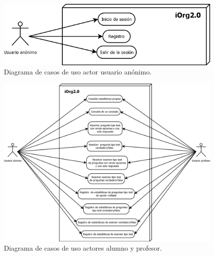 \begin{figure}[!ht]
  \begin{center}
  \includegraphics[width=1\textwidth]{../images/cu_anonimo.png}
  \caption{Diagrama de casos de uso actor usuario anónimo.}
  \label{fig:cu_anonimo}
  \end{center}
\end{figure}



\begin{figure}[!ht]
  \begin{center}
  \includegraphics[width=1\textwidth]{../images/cu_alumno_profesor.png}
  \caption{Diagrama de casos de uso actores alumno y profesor.}
  \label{fig:cu_alumno_profesor}
  \end{center}
\end{figure}



